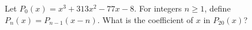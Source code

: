 Let $P_0(x) = x^3 + 313x^2 - 77x - 8$.  For integers $n \ge 1$, define $P_n(x) = P_{n - 1}(x - n)$.  What is the coefficient of $x$ in $P_{20}(x)$?